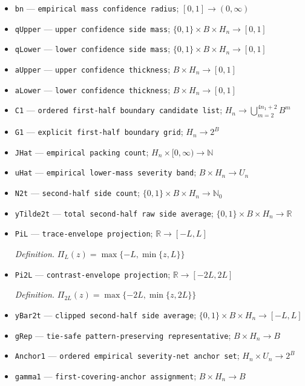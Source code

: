 \documentclass{article}
\begin{document}
\begin{itemize}
  \item \texttt{bn} --- \texttt{empirical mass confidence radius}; \([0,1]\to(0,\infty)\)
  \item \texttt{qUpper} --- \texttt{upper confidence side mass}; \(\{0,1\}\times B\times H_n\to[0,1]\)
  \item \texttt{qLower} --- \texttt{lower confidence side mass}; \(\{0,1\}\times B\times H_n\to[0,1]\)
  \item \texttt{aUpper} --- \texttt{upper confidence thickness}; \(B\times H_n\to[0,1]\)
  \item \texttt{aLower} --- \texttt{lower confidence thickness}; \(B\times H_n\to[0,1]\)
  \item \texttt{C1} --- \texttt{ordered first-\allowbreak{}half boundary candidate list}; \(H_n\to\bigcup_{m=2}^{4n_1+2}B^m\)
  \item \texttt{G1} --- \texttt{explicit first-\allowbreak{}half boundary grid}; \(H_n\to2^B\)
  \item \texttt{JHat} --- \texttt{empirical packing count}; \(H_n\times[0,\infty)\to\mathbb N\)
  \item \texttt{uHat} --- \texttt{empirical lower-\allowbreak{}mass severity band}; \(B\times H_n\to U_n\)
  \item \texttt{N2t} --- \texttt{second-\allowbreak{}half side count}; \(\{0,1\}\times B\times H_n\to\mathbb N_0\)
  \item \texttt{yTilde2t} --- \texttt{total second-\allowbreak{}half raw side average}; \(\{0,1\}\times B\times H_n\to\mathbb R\)
  \item \texttt{PiL} --- \texttt{trace-\allowbreak{}envelope projection}; \(\mathbb R\to[-L,L]\)
  \par\smallskip\noindent\emph{Definition.} \(\Pi_L(z)=\max\{-L,\min\{z,L\}\}\)
  \item \texttt{Pi2L} --- \texttt{contrast-\allowbreak{}envelope projection}; \(\mathbb R\to[-2L,2L]\)
  \par\smallskip\noindent\emph{Definition.} \(\Pi_{2L}(z)=\max\{-2L,\min\{z,2L\}\}\)
  \item \texttt{yBar2t} --- \texttt{clipped second-\allowbreak{}half side average}; \(\{0,1\}\times B\times H_n\to[-L,L]\)
  \item \texttt{gRep} --- \texttt{tie-\allowbreak{}safe pattern-\allowbreak{}preserving representative}; \(B\times H_n\to B\)
  \item \texttt{Anchor1} --- \texttt{ordered empirical severity-\allowbreak{}net anchor set}; \(H_n\times U_n\to2^B\)
  \item \texttt{gamma1} --- \texttt{first-\allowbreak{}covering-\allowbreak{}anchor assignment}; \(B\times H_n\to B\)

\end{itemize}
\end{document}
